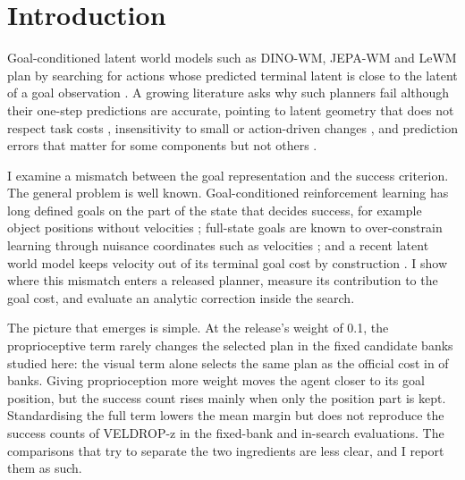 \section{Introduction}
Goal-conditioned latent world models such as DINO-WM, JEPA-WM and LeWM plan by searching for actions whose predicted
terminal latent is close to the latent of a goal observation \cite{zhou2024dinowm,terver2025jepawm,maes2026lewm}. A
growing literature asks why such planners fail although their one-step predictions are accurate, pointing to latent
geometry that does not respect task costs \cite{li2026trm,kang2026aniso,jang2026projection}, insensitivity to small or
action-driven changes \cite{strohm2026little,hara2026criterion}, and prediction errors that matter for some components
but not others \cite{min2026misleads}.

I examine a mismatch between the goal representation and the success criterion. The general problem is well known. Goal-conditioned
reinforcement learning has long defined goals on the part of the state that decides success, for example object
positions without velocities \cite{andrychowicz2017her}; full-state goals are known to over-constrain learning through
nuisance coordinates such as velocities \cite{velez2026gsher}; and a recent latent world model keeps velocity out of its
terminal goal cost by construction \cite{wu2026firm}. I show where this mismatch enters a released planner, measure
its contribution to the goal cost, and evaluate an analytic correction inside the search.

The picture that emerges is simple. At the release's weight of 0.1, the proprioceptive term rarely changes the selected plan in the fixed
candidate banks studied here: the visual term alone selects the same plan as the official cost in \RaVisOnlySame{} of
\RaVisOnlyN{} banks. Giving proprioception more weight moves the agent closer to its goal position, but the
success count rises mainly when only the position part is kept. Standardising the full term lowers the mean margin but does not reproduce the success counts of VELDROP-z in the fixed-bank and in-search evaluations. The comparisons that try to
separate the two ingredients are less clear, and I report them as such.

